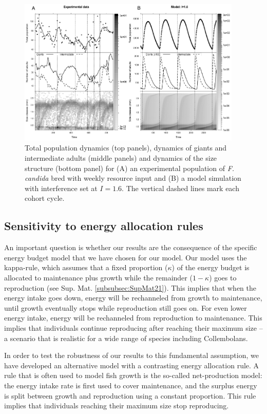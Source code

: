 \begin{figure}[!ht] %
\centering
\includegraphics[width=0.95\textwidth]{4_ChapThe1/Fig/Fig6.pdf} 
\caption[Experiment -- model comparison]{Total
population dynamics (top panels), dynamics of giants and intermediate adults
(middle panels) and dynamics of the size structure (bottom panel) for (A) an
experimental population of \textit{F. candida} bred with weekly resource input
and (B) a model simulation with interference set at $I=1.6$. The vertical
dashed lines mark each cohort cycle. }
\label{Fig4-6}
\end{figure}

\subsection{Sensitivity to energy allocation rules }

An important question is whether our results are the consequence of the specific
energy budget model that we have chosen for our model. Our model uses the
kappa-rule, which assumes that a fixed proportion ($\kappa$) of the energy
budget is allocated to maintenance plus growth while the remainder ($1-\kappa$)
goes to reproduction (see Sup. Mat. \ref{subsubsec:SupMat21}). This implies
that when the energy intake goes down, energy will be rechanneled from growth to maintenance, until growth
eventually stops while reproduction still goes on. For even lower energy intake,
energy will be rechanneled from reproduction to maintenance. This implies that
individuals continue reproducing after reaching their maximum size – a scenario
that is realistic for a wide range of species including Collembolans.

In order to test the robustness of our results to this fundamental assumption,
we have developed an alternative model with a contrasting energy allocation
rule. A rule that is often used to model fish growth is the so-called
net-production model: the energy intake rate is first used to cover maintenance,
and the surplus energy is split between growth and reproduction using a constant
proportion. This rule implies that individuals reaching their maximum size stop
reproducing.

